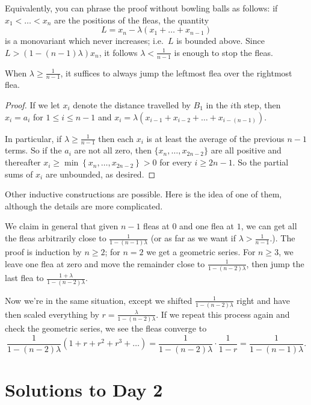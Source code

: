 \begin{remark*}
  Equivalently, you can phrase the proof without
  bowling balls as follows:
  if $x_1 < \dots < x_n$ are the positions of the fleas,
  the quantity
  \[ L = x_n - \lambda(x_1 + \dots + x_{n-1}) \]
  is a monovariant which never increases;
  i.e.\ $L$ is bounded above.
  Since $L > (1-(n-1)\lambda) x_n$, it follows
  $\lambda < \frac{1}{n-1}$ is enough to stop the fleas.
\end{remark*}

\begin{claim*}
When $\lambda \ge \frac{1}{n-1}$,
it suffices to always jump the leftmost flea
over the rightmost flea.
\end{claim*}
\begin{proof}
If we let $x_i$ denote the distance travelled by $B_1$
in the $i$th step,
then $x_i = a_i$ for $1 \le i \le n-1$
and $x_i = \lambda(x_{i-1} + x_{i-2} + \dots + x_{i-(n-1)})$.

In particular, if $\lambda \ge \frac{1}{n-1}$
then each $x_i$ is at least the average of the previous $n-1$ terms.
So if the $a_i$ are not all zero,
then $\{x_{n}, \dots, x_{2n-2}\}$ are all positive
and thereafter $x_i \ge \min \left\{ x_n, \dots, x_{2n-2} \right\} > 0$
for every $i \ge 2n-1$.
So the partial sums of $x_i$ are unbounded, as desired.
\end{proof}

\begin{remark*}
  Other inductive constructions are possible.
  Here is the idea of one of them,
  although the details are more complicated.

  We claim in general that given $n-1$ fleas at $0$
  and one flea at $1$,
  we can get all the fleas arbitrarily close to
  $\frac{1}{1-(n-1)\lambda}$
  (or as far as we want if $\lambda > \frac{1}{n-1}$.).
  The proof is induction by $n \ge 2$;
  for $n=2$ we get a geometric series.
  For $n \ge 3$, we leave one flea at zero
  and move the remainder close to $\frac{1}{1-(n-2)\lambda}$,
  then jump the last flea to
  $\frac{1+\lambda}{1-(n-2)\lambda}$.

  Now we're in the same situation,
  except we shifted $\frac{1}{1-(n-2)\lambda}$ right
  and have then scaled everything by
  $r = \frac{\lambda}{1-(n-2)\lambda}$.
  If we repeat this process again and check the geometric series,
  we see the fleas converge to
  \[ \frac{1}{1-(n-2)\lambda}
    \left( 1 + r + r^2 + r^3 + \dots \right)
    = \frac{1}{1-(n-2)\lambda} \cdot \frac{1}{1-r}
    = \frac{1}{1-(n-1)\lambda}. \]
\end{remark*}
\pagebreak

\section{Solutions to Day 2}